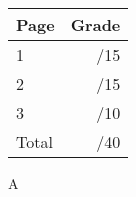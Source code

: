 \documentclass[12pt]{article}
\newcommand{\skipline}{\vspace{12pt}}
\begin{document}
\begin{table}[hbt]
\begin{center}
\begin{tabular}{|l|r|} \hline
Page&Grade\\
\hline \hline
\cline{1-2} 1 & \enspace\enspace\enspace\enspace\enspace\enspace/15\\
\cline{1-2} 2 & \enspace\enspace\enspace\enspace\enspace\enspace/15\\
\cline{1-2} 3 & \enspace\enspace\enspace\enspace\enspace\enspace/10\\
\cline{1-2} Total & \enspace\enspace\enspace\enspace\enspace\enspace/40\\
\hline
\end{tabular}

\skipline

\skipline

\skipline

A
\end{center}
\end{table}
\newpage
\end{document}
